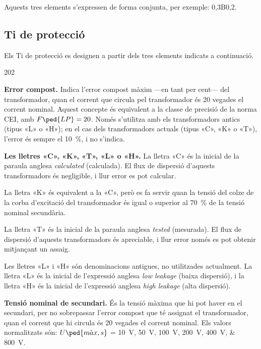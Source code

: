 Aquests tres elements s'expressen de forma conjunta, per exemple:
0,3B0,2.

\subsection{Ti de protecció}\label{sec:Ti-prot-IEEE}

Els Ti de protecció es designen a
partir dels tres elements indicats a continuació.

\begin{dingautolist}{202}
    \item \textbf{Error compost.} Indica l'error compost màxim ---en tant per cent--- del
    transformador, quan el corrent que circula pel
    transformador és 20 vegades el corrent nominal. Aquest concepte
     és equivalent a la classe de precisió de la norma CEI,
     amb $F\ped{LP}=20$. Només s'utilitza amb els transformadors antics (tipus «L» o «H»); en el cas dels transformadors actuals
     (tipus «C», «K» o «T»), l'error és sempre el \qty{10}{\percent}, i no s'indica.

    \item \textbf{Les lletres «C», «K», «T», «L» o «H».} La lletra «C» és la inicial de la
    paraula  anglesa \textit{calculated} (calculada). El flux de dispersió d'aquests transformadors és negligible, i llur error es pot calcular.

    La lletra «K» és equivalent a la «C», però es fa servir quan la tensió del colze de la corba d'excitació del transformador és igual o superior al \qty{70}{\percent}
    de la tensió nominal secundària.

    La lletra «T» és la inicial de la   paraula  anglesa \textit{tested} (mesurada). El flux de dispersió d'aquests transformadors és apreciable, i llur error només es pot obtenir mitjançant un assaig.

    Les lletres «L» i «H» són denominacions antigues,  no utilitzades actualment. La lletra «L» és la inicial de l'expressió anglesa \textit{low leakage} (baixa
    dispersió), i la lletra «H» és la inicial de l'expressió anglesa \textit{high leakage} (alta dispersió).  
 
    \item \textbf{Tensió nominal de secundari.} És la tensió màxima
    que hi pot haver en el secundari, per no sobrepassar l'error compost que té
    assignat el transformador, quan el corrent que hi circula
     és 20 vegades el corrent nominal. Els valors
    normalitzats són: $U\ped{m\grave{a}x,s}$ = \qtylist{10; 50; 100; 200; 400; 800}{V}.


\end{dingautolist}
